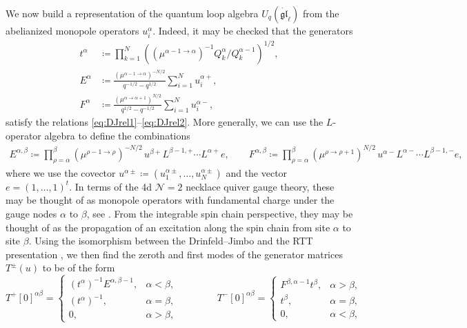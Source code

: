 We now build a representation of the quantum loop algebra $U_q(\dot{\mathfrak{gl}}_\ell)$ from the abelianized monopole operators $u_i^\alpha$. Indeed, it may be checked that the generators
\begin{align}
    t^\alpha &\coloneq \prod_{k=1}^N ((\mu^{\alpha-1\to\alpha})^{-1} Q_k^\alpha/Q_k^{\alpha-1})^{1/2}, \label{eq:DJgen1} \\
    E^{\alpha} &\coloneq \frac{(\mu^{\alpha-1\to\alpha})^{-N/2}}{q^{-1/2}-q^{1/2}} \sum_{i=1}^N u_i^{\alpha+}, \\
    F^{\alpha} &\coloneq \frac{(\mu^{\alpha\to\alpha+1})^{N/2}}{q^{1/2}-q^{-1/2}} \sum_{i=1}^N u_i^{\alpha-}, \label{eq:DJgen2}
\end{align}
satisfy the relations \eqref{eq:DJrel1}--\eqref{eq:DJrel2}. More generally, we can use the $L$-operator algebra to define the combinations
\begin{align}
    E^{\alpha,\beta} \coloneq \prod_{\rho=\alpha}^{\beta} (\mu^{\rho-1\to\rho})^{-N/2} \, u^{\beta+} L^{\beta-1,+} \cdots L^{\alpha+} e, \qquad F^{\alpha,\beta} \coloneq \prod_{\rho=\alpha}^{\beta} (\mu^{\rho\to\rho+1})^{N/2} \, u^{\alpha-} L^{\alpha-} \cdots L^{\beta-1,-} e,
\end{align}
where we use the covector $u^{\alpha\pm} \coloneq (u_1^{\alpha\pm},\dots,u_N^{\alpha\pm})$ and the vector $e = (1,\dots,1)^t$. In terms of the 4d $\mathcal{N}=2$ necklace quiver gauge theory, these may be thought of as monopole operators with fundamental charge under the gauge nodes $\alpha$ to $\beta$, see \cite[\S 6.6.1]{bullimore_coulomb_2015}. From the integrable spin chain perspective, they may be thought of as the propagation of an excitation along the spin chain from site $\alpha$ to site $\beta$. Using the isomorphism between the Drinfeld--Jimbo and the RTT presentation \cite{finkelberg_shifted_2019}, we then find the zeroth and first modes of the generator matrices $T^\pm(u)$ to be of the form
\begin{equation}
    T^+[0]^{\alpha\beta} =
    \begin{cases}
        (t^\alpha)^{-1} E^{\alpha,\beta-1}, & \alpha < \beta,  \\
        (t^\alpha)^{-1}, & \alpha = \beta, \\
        0, & \alpha > \beta,
    \end{cases} \qquad \qquad 
    T^-[0]^{\alpha\beta} =
    \begin{cases}
        F^{\beta,\alpha-1} t^\beta, & \alpha > \beta, \\
        t^\beta, & \alpha = \beta, \\
        0, & \alpha < \beta,
    \end{cases}
\end{equation}
